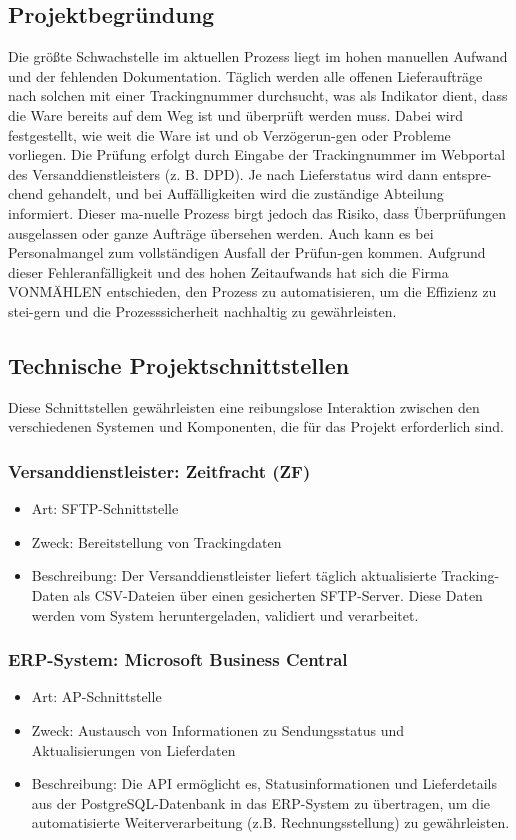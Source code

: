 \subsection{Projektbegründung} 
\label{sec:Projektbegruendung}
Die größte Schwachstelle im aktuellen Prozess liegt im hohen manuellen Aufwand und der fehlenden Dokumentation. 
Täglich werden alle offenen Lieferaufträge nach solchen mit einer Trackingnummer durchsucht, was als Indikator dient, 
dass die Ware bereits auf dem Weg ist und überprüft werden muss. Dabei wird festgestellt, wie weit die Ware ist und ob 
Verzögerun-gen oder Probleme vorliegen. Die Prüfung erfolgt durch Eingabe der Trackingnummer im Webportal des 
Versanddienstleisters (z. B. DPD). Je nach Lieferstatus wird dann entspre-chend gehandelt, und bei Auffälligkeiten 
wird die zuständige Abteilung informiert. Dieser ma-nuelle Prozess birgt jedoch das Risiko, dass Überprüfungen 
ausgelassen oder ganze Aufträge übersehen werden. Auch kann es bei Personalmangel zum vollständigen Ausfall der 
Prüfun-gen kommen. Aufgrund dieser Fehleranfälligkeit und des hohen Zeitaufwands hat sich die Firma VONMÄHLEN 
entschieden, den Prozess zu automatisieren, um die Effizienz zu stei-gern und die Prozesssicherheit nachhaltig zu 
gewährleisten.

\subsection{Technische Projektschnittstellen} 
\label{sec:Projektschnittstellen}
Diese Schnittstellen gewährleisten eine reibungslose Interaktion zwischen den verschiedenen Systemen und Komponenten, 
die für das Projekt erforderlich sind.

\subsubsection{Versanddienstleister: Zeitfracht (ZF)}
\begin{itemize}
\item Art: SFTP-Schnittstelle
\item Zweck: Bereitstellung von Trackingdaten
\item Beschreibung: Der Versanddienstleister liefert täglich aktualisierte Tracking-Daten als CSV-Dateien über einen 
gesicherten SFTP-Server. Diese Daten werden vom System heruntergeladen, validiert und verarbeitet.
\end{itemize}

\subsubsection{ERP-System: Microsoft Business Central}
\begin{itemize}
\item Art: AP-Schnittstelle
\item Zweck: Austausch von Informationen zu Sendungsstatus und Aktualisierungen von Lieferdaten
\item Beschreibung: Die API ermöglicht es, Statusinformationen und Lieferdetails aus der 
PostgreSQL-Datenbank in das ERP-System zu übertragen, um die automatisierte Weiterverarbeitung 
(z.B. Rechnungsstellung) zu gewährleisten.
\end{itemize}

